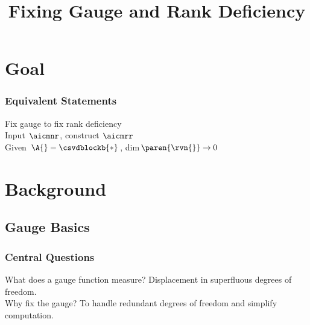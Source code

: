 \documentclass[]{beamer}
\title{Fixing Gauge and Rank Deficiency}
\author[\mg{\fontsize{5}{15}\selectfont DISTRIBUTION A. Approved for public release: distribution unlimited.}]{}
\begin{document}

\tpage

\section{Goal}

\begin{frame}      %
\frametitle{Equivalent Statements}
  Fix gauge to fix rank deficiency \\[20pt]
  \pause
  Input $\aicmnr$, construct $\aicmrr$  \\[20pt]
  \pause
  Given $\A{} = \csvdblockb{*}$, dim$\paren{\rvn{}} \to 0$
\end{frame}


\section{Background}

\subsection{Gauge Basics}

\begin{frame}      %
\frametitle{Central Questions}
  What does a gauge function measure?  Displacement in superfluous degrees of freedom.\\[20pt]
  \pause
  Why fix the gauge? To handle redundant degrees of freedom and simplify computation.
\end{frame}
\end{document}
